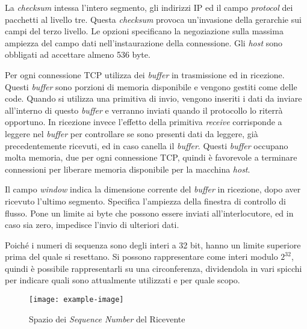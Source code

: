 \documentclass{article}
\numberwithin{equation}{subsection}
\begin{document}
La \textit{checksum} intessa l'intero segmento, gli indirizzi \textcolor{Bittersweet}{IP} ed il campo \textit{protocol} dei pacchetti al livello tre. Questa \textit{checksum} provoca un'invasione della gerarchie sui campi del 
terzo livello. Le opzioni specificano la negoziazione sulla massima ampiezza del campo dati nell'instaurazione della connessione. Gli \textit{host} sono obbligati ad accettare 
almeno 536 byte. 

Per ogni connessione \textcolor{Bittersweet}{TCP} utilizza dei \textit{buffer} in trasmissione ed in ricezione. Questi \textit{buffer} sono porzioni di memoria disponibile e vengono gestiti come delle code. Quando si utilizza una primitiva di invio, vengono inseriti i dati da inviare all'interno di questo \textit{buffer} e verranno inviati quando il protocollo lo riterrà opportuno. In ricezione invece l'effetto della primitiva \textit{receive} corrisponde a leggere nel \textit{buffer} per controllare se sono presenti dati da leggere, già precedentemente ricevuti, ed in caso canella il \textit{buffer}. 
Questi \textit{buffer} occupano molta memoria, due per ogni connessione \textcolor{Bittersweet}{TCP}, quindi è favorevole a terminare connessioni per liberare memoria disponibile per la macchina \textit{host}. 

Il campo \textit{window} indica la dimensione corrente del \textit{buffer} in ricezione, dopo aver ricevuto l'ultimo segmento. Specifica l'ampiezza della finestra di controllo di flusso. Pone un limite ai byte che possono essere inviati all'interlocutore, ed in caso sia zero, impedisce l'invio di ulteriori dati. 

Poiché i numeri di sequenza sono degli interi a 32 bit, hanno un limite superiore prima del quale si resettano. Si possono rappresentare come interi modulo $2^{32}$, quindi è possibile rappresentarli su una circonferenza, dividendola in vari spicchi per indicare quali sono 
attualmente utilizzati e per quale scopo. 

\begin{figure}[H]%
    \centering%
    \texttt{[image: example-image]}%
    \caption{Spazio dei \textit{Sequence Number} del Ricevente}%
\end{figure}
\end{document}
